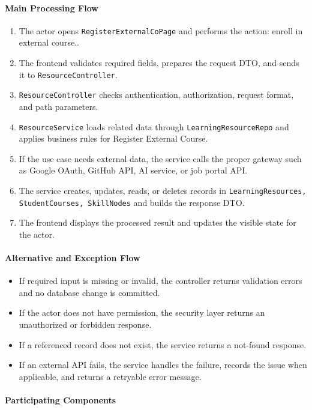 \paragraph{Main Processing Flow}

\begin{enumerate}
    \item The actor opens \texttt{RegisterExternalCoPage} and performs the action: enroll in external course..
    \item The frontend validates required fields, prepares the request DTO, and sends it to \texttt{ResourceController}.
    \item \texttt{ResourceController} checks authentication, authorization, request format, and path parameters.
    \item \texttt{ResourceService} loads related data through \texttt{LearningResourceRepo} and applies business rules for Register External Course.
    \item If the use case needs external data, the service calls the proper gateway such as Google OAuth, GitHub API, AI service, or job portal API.
    \item The service creates, updates, reads, or deletes records in \texttt{LearningResources, StudentCourses, SkillNodes} and builds the response DTO.
    \item The frontend displays the processed result and updates the visible state for the actor.
\end{enumerate}

\paragraph{Alternative and Exception Flow}

\begin{itemize}
    \item If required input is missing or invalid, the controller returns validation errors and no database change is committed.
    \item If the actor does not have permission, the security layer returns an unauthorized or forbidden response.
    \item If a referenced record does not exist, the service returns a not-found response.
    \item If an external API fails, the service handles the failure, records the issue when applicable, and returns a retryable error message.
\end{itemize}

\paragraph{Participating Components}

